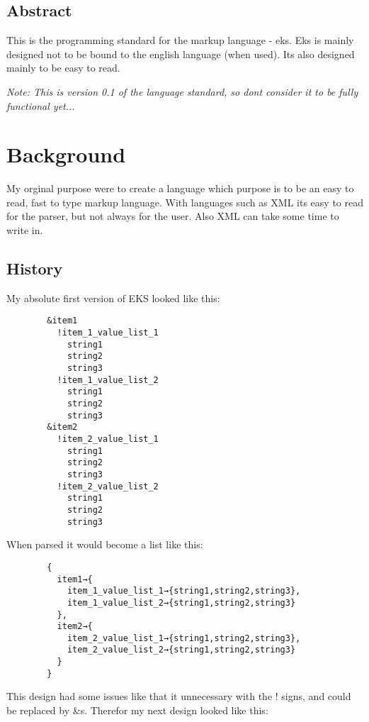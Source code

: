 \documentclass{book}
\begin{document}
	\section*{Abstract}
	
	This is the programming standard for the markup language - eks. 
	Eks is mainly designed not to be bound to the english language (when used). Its also designed mainly to be easy to read.
	
	\emph{Note: This is version 0.1 of the language standard, so dont consider it to be fully functional yet...}
	
	\newpage
	
	\tableofcontents
	\newpage
	
	\chapter{Background}
	
	My orginal purpose were to create a language which purpose is to be an easy to read, fast to type markup language. With languages such as XML its easy to read for the parser, but not always for the user. 
	Also XML can take some time to write in. 
	
	\section{History}
	
	My absolute first version of EKS looked like this:
	
	\begin{verbatim}
		&item1
		  !item_1_value_list_1
		    string1
		    string2
		    string3
		  !item_1_value_list_2
		    string1
		    string2
		    string3
		&item2
		  !item_2_value_list_1
		    string1
		    string2
		    string3
		  !item_2_value_list_2
		    string1
		    string2
		    string3
	\end{verbatim}
	
	When parsed it would become a list like this:\\
	
	\begin{verbatim}
		{
		  item1→{
		    item_1_value_list_1→{string1,string2,string3},
		    item_1_value_list_2→{string1,string2,string3}
		  },
		  item2→{
		    item_2_value_list_1→{string1,string2,string3},
		    item_2_value_list_2→{string1,string2,string3}
		  }
		}
	\end{verbatim}
	
	This design had some issues like that it unnecessary with the ! signs, and could be replaced by \&s. Therefor my next design looked like this:
	
\end{document}
